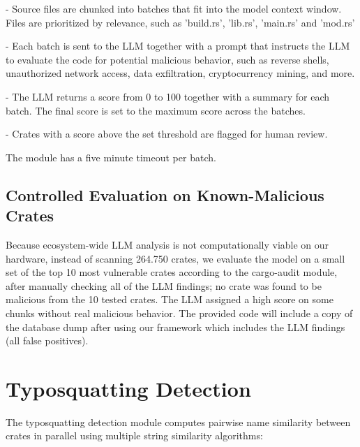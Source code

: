 - Source files are chunked into batches that fit into the model context window. Files are prioritized by relevance, such as 'build.rs', 'lib.rs', 'main.rs' and 'mod.rs'

- Each batch is sent to the LLM together with a prompt that instructs the LLM to evaluate the code for potential malicious behavior, such as reverse shells, unauthorized network access, data exfiltration, cryptocurrency mining, and more.

- The LLM returns a score from 0 to 100 together with a summary for each batch. The final score is set to the maximum score across the batches.

- Crates with a score above the set threshold are flagged for human review.

The module has a five minute timeout per batch.

\subsection{Controlled Evaluation on Known-Malicious Crates}\label{subsect:llm-controlled}

Because ecosystem-wide LLM analysis is not computationally viable on our hardware, instead of scanning 264.750 crates, we evaluate the model on a small set of the top 10 most vulnerable crates according to the cargo-audit module, after manually checking all of the LLM findings; no crate was found to be malicious from the 10 tested crates. The LLM assigned a high score on some chunks without real malicious behavior. The provided code will include a copy of the database dump after using our framework which includes the LLM findings (all false positives).

\section{Typosquatting Detection}\label{sect:typosquatting-module}

The typosquatting detection module computes pairwise name similarity between crates in parallel using multiple string similarity algorithms:

